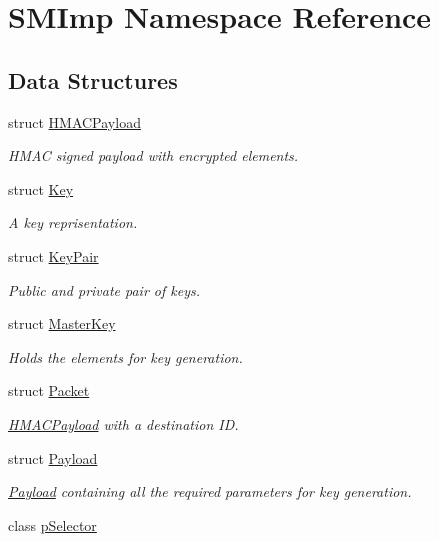 \hypertarget{namespaceSMImp}{}\section{S\+M\+Imp Namespace Reference}
\label{namespaceSMImp}
\subsection*{Data Structures}
\begin{DoxyCompactItemize}
\item 
struct \hyperlink{structSMImp_1_1HMACPayload}{H\+M\+A\+C\+Payload}
\begin{DoxyCompactList}\small\item\em H\+M\+AC signed payload with encrypted elements. \end{DoxyCompactList}\item 
struct \hyperlink{structSMImp_1_1Key}{Key}
\begin{DoxyCompactList}\small\item\em A key reprisentation. \end{DoxyCompactList}\item 
struct \hyperlink{structSMImp_1_1KeyPair}{Key\+Pair}
\begin{DoxyCompactList}\small\item\em Public and private pair of keys. \end{DoxyCompactList}\item 
struct \hyperlink{structSMImp_1_1MasterKey}{Master\+Key}
\begin{DoxyCompactList}\small\item\em Holds the elements for key generation. \end{DoxyCompactList}\item 
struct \hyperlink{structSMImp_1_1Packet}{Packet}
\begin{DoxyCompactList}\small\item\em \hyperlink{structSMImp_1_1HMACPayload}{H\+M\+A\+C\+Payload} with a destination ID. \end{DoxyCompactList}\item 
struct \hyperlink{structSMImp_1_1Payload}{Payload}
\begin{DoxyCompactList}\small\item\em \hyperlink{structSMImp_1_1Payload}{Payload} containing all the required parameters for key generation. \end{DoxyCompactList}\item 
class \hyperlink{classSMImp_1_1pSelector}{p\+Selector}

\end{DoxyCompactItemize}
